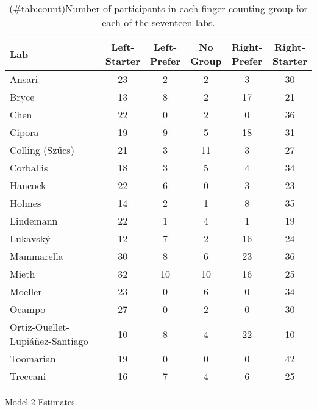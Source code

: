 \begin{appendix}
\begin{table}
\caption{(\#tab:count)Number of participants in each finger counting group for each of the seventeen labs.}
\centering
\begin{tabular}[t]{lccccc}
\toprule
Lab & \makecell[c]{Left-\\Starter} & \makecell[c]{Left-\\Prefer} & \makecell[c]{No\\Group} & \makecell[c]{Right-\\Prefer} & \makecell[c]{Right-\\Starter}\\
\midrule
Ansari & 23 & 2 & 2 & 3 & 30\\
Bryce & 13 & 8 & 2 & 17 & 21\\
Chen & 22 & 0 & 2 & 0 & 36\\
Cipora & 19 & 9 & 5 & 18 & 31\\
Colling (Szűcs) & 21 & 3 & 11 & 3 & 27\\
Corballis & 18 & 3 & 5 & 4 & 34\\
Hancock & 22 & 6 & 0 & 3 & 23\\
Holmes & 14 & 2 & 1 & 8 & 35\\
Lindemann & 22 & 1 & 4 & 1 & 19\\
Lukavský & 12 & 7 & 2 & 16 & 24\\
Mammarella & 30 & 8 & 6 & 23 & 36\\
Mieth & 32 & 10 & 10 & 16 & 25\\
Moeller & 23 & 0 & 6 & 0 & 34\\
Ocampo & 27 & 0 & 2 & 0 & 30\\
Ortiz-Ouellet-Lupiáñez-Santiago & 10 & 8 & 4 & 22 & 10\\
Toomarian & 19 & 0 & 0 & 0 & 42\\
Treccani & 16 & 7 & 4 & 6 & 25\\
\bottomrule
\end{tabular}
\end{table}

\begin{table}[!p]
\caption{\label{tab:mod2}Model 2 Estimates.}
\begin{subtable}{\textwidth}
\centering
\begin{table}[H]\centering\begingroup\fontsize{10}{12}\selectfont


\end{table}
\end{subtable}
\end{table}
\end{appendix}
